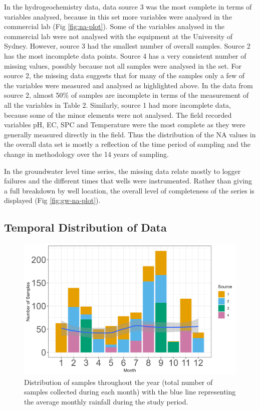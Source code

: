\documentclass[, manuscript]{copernicus}
\begin{document}
In the hydrogeochemistry data, data source 3 was the most complete in
terms of variables analysed, because in this set more variables were
analysed in the commercial lab (Fig \ref{fig:na-plot}). Some of the
variables analysed in the commercial lab were not analysed with the
equipment at the University of Sydney. However, source 3 had the
smallest number of overall samples. Source 2 has the most incomplete
data points. Source 4 has a very consistent number of missing values,
possibly because not all samples were analysed in the set. For source 2,
the missing data suggests that for many of the samples only a few of the
variables were measured and analysed as highlighted above. In the data
from source 2, almost 50\% of samples are incomplete in terms of the
measurement of all the variables in Table 2. Similarly, source 1 had
more incomplete data, because some of the minor elements were not
analysed. The field recorded variables pH, EC, SPC and Temperature were
the most complete as they were generally measured directly in the field.
Thus the distribution of the NA values in the overall data set is mostly
a reflection of the time period of sampling and the change in
methodology over the 14 years of sampling.

In the groundwater level time series, the missing data relate mostly to
logger failures and the different times that wells were instrumented.
Rather than giving a full breakdown by well location, the overall level
of completeness of the series is displayed (Fig \ref{fig:gw-na-plot}).

\subsection{Temporal Distribution of Data}

\clearpage

\begin{figure}
\includegraphics[width=0.7\linewidth]{Figures/monthly} \caption{Distribution of samples throughout the year (total number of samples collected during each month) with the blue line representing the average monthly rainfall during the study period. }\label{fig:month-plot}
\end{figure}
\end{document}
